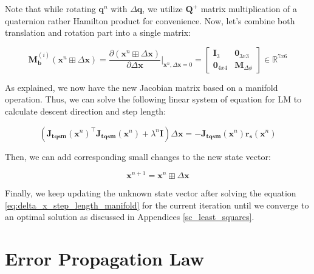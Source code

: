 \documentclass[a4paper]{report}
\numberwithin{figure}{section}
\newcommand{\R}{\mathbb{R}}
\begin{document}
\begin{appendices}
Note that while rotating $\mathbf{q}^n$ with $\Delta \mathbf{\mathbf{q}}$, 
we utilize $\mathbf{Q}^{+}$ matrix multiplication of a quaternion rather Hamilton product 
for convenience.
Now, let's combine both translation and rotation part into a single matrix:

\begin{equation}
\mathbf{M}_{\mathbf{b}}^{(i)}(\mathbf{x}^n \boxplus \Delta \mathbf{x}) = 
    \frac{\partial (\mathbf{x}^n \boxplus \Delta \mathbf{x})}
  {\partial \Delta \mathbf{x}} \bigg|_{\mathbf{x}^n,\Delta \mathbf{x}=0} = 
  \begin{bmatrix} 
  \mathbf{I}_3 & \mathbf{0}_{3x3} \\ 
  \mathbf{0}_{4x4} & \mathbf{M}_{\Delta \phi}   
  \end{bmatrix}
  \in \R^{7x6}
\end{equation}

As explained, we now have the new Jacobian matrix based on a manifold operation.
Thus, we can solve the following linear system of equation for LM 
to calculate descent direction and step length:

\begin{equation}\label{eq:delta_x_step_length_manifold}
  (\mathbf{J_{tqsm}}(\mathbf{x}^n)^\top\mathbf{J_{tqsm}}(\mathbf{x}^n) 
  + \lambda^n \mathbf{I})
  \Delta \mathbf{x} =  
  -\mathbf{J_{tqsm}}(\mathbf{x}^n)\mathbf{r_s}(\mathbf{x}^n)
\end{equation}

Then, we can add corresponding small changes to the new state vector:

\begin{equation}
  \mathbf{x}^{n+1} = \mathbf{x}^{n} \boxplus \Delta \mathbf{x}
\end{equation}

Finally, we keep updating the unknown state vector after solving 
the equation \eqref{eq:delta_x_step_length_manifold} for the current iteration 
until we converge to an optimal solution as discussed in Appendices 
\ref{sc_least_squares}.

\section{Error Propagation Law} \label{sc_error_prop_law}


\end{appendices}
\end{document}
